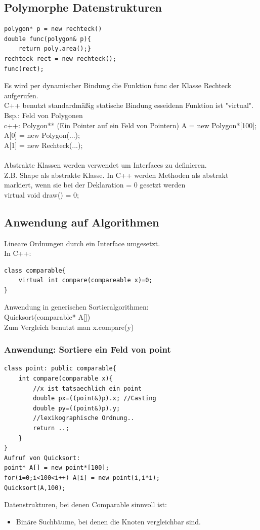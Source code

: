 \documentclass[a4paper]{article}
\begin{document}
\subsection*{Polymorphe Datenstrukturen}
\begin{lstlisting}
polygon* p = new rechteck()
double func(polygon& p){
	return poly.area();}
rechteck rect = new rechteck();
func(rect);
\end{lstlisting}
Es wird per dynamischer Bindung die Funktion func der Klasse Rechteck aufgerufen.\\
C++ benutzt standardmäßig statische Bindung esseidenn Funktion ist "virtual".
Bsp.: Feld von Polygonen\\
c++: Polygon** (Ein Pointer auf ein Feld von Pointern) A = new Polygon*[100];\\
A[0] = new Polygon(...);\\
A[1] = new Rechteck(...);\\
\\
Abstrakte Klassen werden verwendet um Interfaces zu definieren.\\
Z.B. Shape als abstrakte Klasse. In C++ werden Methoden als abstrakt markiert, wenn sie bei der Deklaration = 0 gesetzt werden\\
virtual void draw() = 0;\\
\subsection*{Anwendung auf Algorithmen}
Lineare Ordnungen durch ein Interface umgesetzt.\\
In C++:\\
\begin{lstlisting}
class comparable{
	virtual int compare(compareable x)=0;
}
\end{lstlisting}
Anwendung in generischen Sortieralgorithmen:\\
Quicksort(comparable* A[])\\
Zum Vergleich benutzt man x.compare(y)\\
\subsubsection*{Anwendung: Sortiere ein Feld von point}
\begin{lstlisting}
class point: public comparable{
	int compare(comparable x){
		//x ist tatsaechlich ein point
		double px=((point&)p).x; //Casting
		double py=((point&)p).y;
		//lexikographische Ordnung..
		return ..;
	}
}
Aufruf von Quicksort:
point* A[] = new point*[100];
for(i=0;i<100<i++) A[i] = new point(i,i*i);
Quicksort(A,100);
\end{lstlisting}
Datenstrukturen, bei denen Comparable sinnvoll ist:\\
\begin{itemize}
\item Binäre Suchbäume, bei denen die Knoten vergleichbar sind.
\end{itemize}
\end{document}
